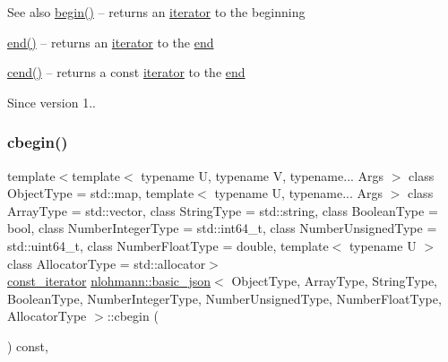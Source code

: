 \begin{DoxySeeAlso}{See also}
\hyperlink{classnlohmann_1_1basic__json_ad4e381c54039607be08d7af41a1f6ad1}{begin()} -- returns an \hyperlink{classnlohmann_1_1basic__json_1_1iterator}{iterator} to the beginning 

\hyperlink{classnlohmann_1_1basic__json_a12ccf14d39ddae52f6c7e126105a230b}{end()} -- returns an \hyperlink{classnlohmann_1_1basic__json_1_1iterator}{iterator} to the \hyperlink{classnlohmann_1_1basic__json_a12ccf14d39ddae52f6c7e126105a230b}{end} 

\hyperlink{classnlohmann_1_1basic__json_aa730d68d55ccc48d2cd4835ff46d2a0f}{cend()} -- returns a const \hyperlink{classnlohmann_1_1basic__json_1_1iterator}{iterator} to the \hyperlink{classnlohmann_1_1basic__json_a12ccf14d39ddae52f6c7e126105a230b}{end}
\end{DoxySeeAlso}
\begin{DoxySince}{Since}
version 1.. 
\end{DoxySince}
\hypertarget{classnlohmann_1_1basic__json_a7355a41b0033ff8a27d58550544d5a59}{}\label{classnlohmann_1_1basic__json_a7355a41b0033ff8a27d58550544d5a59} 
\subsubsection{\texorpdfstring{cbegin()}{cbegin()}}
{\footnotesize\ttfamily template$<$template$<$ typename U, typename V, typename... Args $>$ class Object\+Type = std\+::map, template$<$ typename U, typename... Args $>$ class Array\+Type = std\+::vector, class String\+Type  = std\+::string, class Boolean\+Type  = bool, class Number\+Integer\+Type  = std\+::int64\+\_\+t, class Number\+Unsigned\+Type  = std\+::uint64\+\_\+t, class Number\+Float\+Type  = double, template$<$ typename U $>$ class Allocator\+Type = std\+::allocator$>$ \\
\hyperlink{classnlohmann_1_1basic__json_1_1const__iterator}{const\+\_\+iterator} \hyperlink{classnlohmann_1_1basic__json}{nlohmann\+::basic\+\_\+json}$<$ Object\+Type, Array\+Type, String\+Type, Boolean\+Type, Number\+Integer\+Type, Number\+Unsigned\+Type, Number\+Float\+Type, Allocator\+Type $>$\+::cbegin (\begin{DoxyParamCaption}{ }\end{DoxyParamCaption}) const\hspace{0.3cm}{\ttfamily [inline]}, {\ttfamily [noexcept]}}



